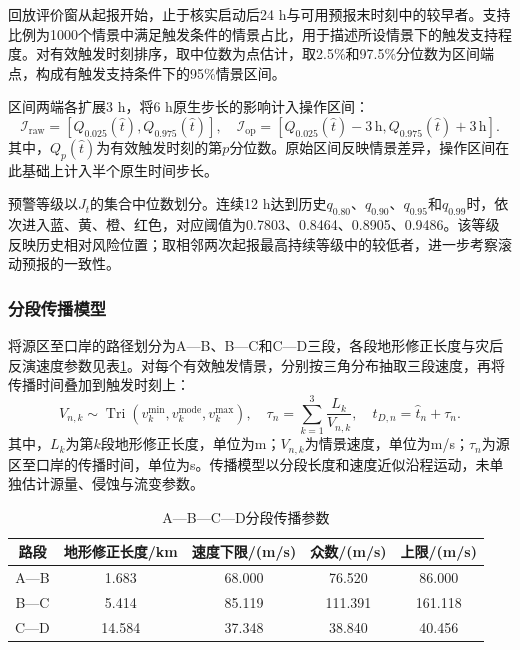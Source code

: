 回放评价窗从起报开始，止于核实启动后24 h与可用预报末时刻中的较早者。支持比例为1000个情景中满足触发条件的情景占比，用于描述所设情景下的触发支持程度。对有效触发时刻排序，取中位数为点估计，取2.5\%和97.5\%分位数为区间端点，构成有触发支持条件下的95\%情景区间。

区间两端各扩展3 h，将6 h原生步长的影响计入操作区间：
\begin{equation}
 \mathcal I_{\mathrm{raw}}=[Q_{0.025}(\widehat t),Q_{0.975}(\widehat t)],
 \quad
 \mathcal I_{\mathrm{op}}=[Q_{0.025}(\widehat t)-3\,\mathrm{h},
                         Q_{0.975}(\widehat t)+3\,\mathrm{h}].
 \label{eq:q3-interval}
\end{equation}
其中，$Q_p(\widehat t)$为有效触发时刻的第$p$分位数。原始区间反映情景差异，操作区间在此基础上计入半个原生时间步长。

预警等级以$J_t$的集合中位数划分。连续12 h达到历史$q_{0.80}$、$q_{0.90}$、$q_{0.95}$和$q_{0.99}$时，依次进入蓝、黄、橙、红色，对应阈值为0.7803、0.8464、0.8905、0.9486。该等级反映历史相对风险位置；取相邻两次起报最高持续等级中的较低者，进一步考察滚动预报的一致性。

\subsubsection{分段传播模型}
将源区至口岸的路径划分为A—B、B—C和C—D三段，各段地形修正长度与灾后反演速度参数见表\ref{tab:q3-transport}。对每个有效触发情景，分别按三角分布抽取三段速度，再将传播时间叠加到触发时刻上：
\begin{equation}
 V_{n,k}\sim\operatorname{Tri}(v_k^{\min},v_k^{\mathrm{mode}},v_k^{\max}),
 \quad \tau_n=\sum_{k=1}^{3}\frac{L_k}{V_{n,k}},
 \quad \widehat t_{D,n}=\widehat t_n+\tau_n.
 \label{eq:q3-arrival}
\end{equation}
其中，$L_k$为第$k$段地形修正长度，单位为m；$V_{n,k}$为情景速度，单位为m/s；$\tau_n$为源区至口岸的传播时间，单位为s。传播模型以分段长度和速度近似沿程运动，未单独估计源量、侵蚀与流变参数。
\begin{table}[H]
 \centering
 \caption{A—B—C—D分段传播参数}
 \label{tab:q3-transport}
 \begin{tabular}{ccccc}
 \toprule
 路段 & 地形修正长度/km & 速度下限/(m/s) & 众数/(m/s) & 上限/(m/s)\\
 \midrule
 A—B & 1.683 & 68.000 & 76.520 & 86.000\\
 B—C & 5.414 & 85.119 & 111.391 & 161.118\\
 C—D & 14.584 & 37.348 & 38.840 & 40.456\\
 \bottomrule
 \end{tabular}
\end{table}

